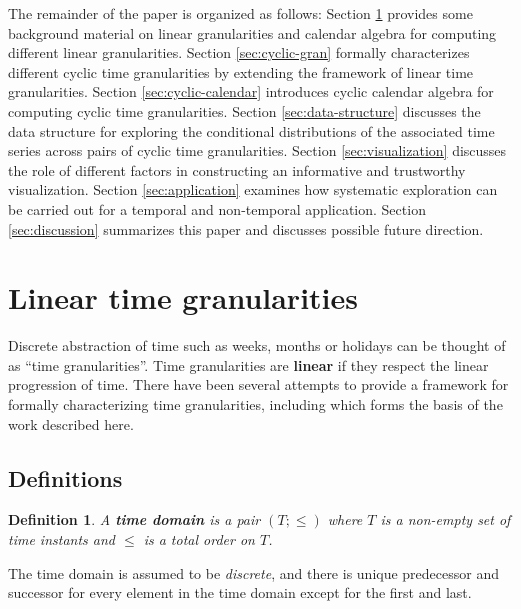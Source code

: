 \documentclass[12pt]{article}
\begin{document}
The remainder of the paper is organized as follows: Section \ref{sec:linear-time} provides some background material on linear granularities and calendar algebra for computing different linear granularities. Section \ref{sec:cyclic-gran} formally characterizes different cyclic time granularities by extending the framework of linear time granularities. Section \ref{sec:cyclic-calendar} introduces cyclic calendar algebra for computing cyclic time granularities. Section \ref{sec:data-structure} discusses the data structure for exploring the conditional distributions of the associated time series across pairs of cyclic time granularities. Section \ref{sec:visualization} discusses the role of different factors in constructing an informative and trustworthy visualization. Section \ref{sec:application} examines how systematic exploration can be carried out for a temporal and non-temporal application. Section \ref{sec:discussion} summarizes this paper and discusses possible future direction.

\hypertarget{sec:linear-time}{%
\section{Linear time granularities}\label{sec:linear-time}}

Discrete abstraction of time such as weeks, months or holidays can be thought of as ``time granularities''. Time granularities are \textbf{linear} if they respect the linear progression of time. There have been several attempts to provide a framework for formally characterizing time granularities, including \citet{Bettini1998-ed} which forms the basis of the work described here.

\hypertarget{definitions}{%
\subsection{Definitions}\label{definitions}}

\newtheorem{definition}{Definition}

\begin{definition}\label{def:definition}
A {\bf time domain} is a pair $(T; \le)$ where $T$ is a non-empty set of time instants and $\le$ is a total order on $T$.
\end{definition}

The time domain is assumed to be \emph{discrete}, and there is unique predecessor and successor for every element in the time domain except for the first and last.
\end{document}
